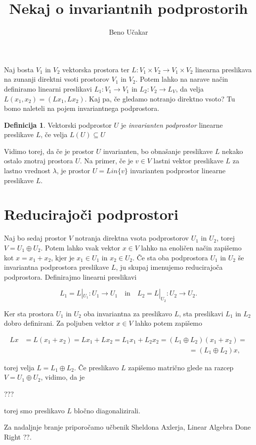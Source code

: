 \documentclass[a4paper,12pt]{article}
\theoremstyle{definition}
\newtheorem{definicija}{Definicija}
\begin{document}
    \title{Nekaj o invariantnih podprostorih}
    \author{Beno Učakar}
    \date{}
\maketitle

Naj bosta $V_1$ in $V_2$ vektorska prostora ter $L \colon V_1 \times V_2 \to V_1 \times V_2$ linearna preslikava na zunanji direktni vsoti prostorov $V_1$ in $V_2$.
Potem lahko na narave način definiramo linearni preslikavi $L_1 \colon V_1 \to V_1$ in $L_2 \colon V_2 \to L_V$, da velja  
\(L(x_1, x_2) = (Lx_1, Lx_2).\)
Kaj pa, če gledamo notranjo direktno vsoto? Tu bomo naleteli na pojem invariantnega podprostora.

    \begin{definicija}
      Vektorski podprostor $U$ je \emph{invarianten podprostor} linearne preslikave $L$, če velja 
   \( L(U) \subseteq U \)
    \end{definicija}
    

Vidimo torej, da če je prostor $U$ invarianten, bo obnašanje preslikave $L$ nekako ostalo znotraj prostora $U$.
Na primer, če je $v\in V$ lastni vektor preslikave $L$ za lastno vrednost \( \lambda\), je prostor 
\(U = Lin \{ v \}\) invarianten podprostor linearne preslikave $L$.


\section*{Reducirajoči podprostori} 
Naj bo sedaj prostor $V$ notranja direktna vsota podprostorov $U_1$ in $U_2$, torej $V = U_1 \oplus U_2$.
Potem lahko vsak vektor $x \in V$ lahko na enoličen način zapišemo kot $x = x_1 + x_2$, kjer je $x_1 \in U_1$ in $x_2 \in U_2$.
Če sta oba podprostora $U_1$ in $U_2$ še invariantna podprostora preslikave $L$, ju skupaj imenujemo reducirajoča podprostora.
Definirajmo linearni preslikavi 

\[L_1 = L| _{U_1} \colon U_1 \to U_1 \quad \text{in} \quad L_2 = L| _{U_2} \colon U_2 \to U_2.\] 


Ker sta prostora $U_1$ in $U_2$ oba invariantna za preslikavo $L$, sta preslikavi $L_1$ in $L_2$ dobro definirani.
Za poljuben vektor $x \in V$ lahko potem zapišemo 


\begin{equation}
    \begin{aligned}
        Lx &= L(x_1 + x_2) = Lx_1 + Lx_2 = L_1x_1 + L_2x_2 = (L_1 \oplus L_2)(x_1 + x_2)= \\
        &\hspace{10cm} =(L_1 \oplus L_2)x,
    \end{aligned}
    \end{equation}
    
% 
torej velja $L = L_1 \oplus L_2$.
Če preslikavo $L$ zapišemo matrično glede na razcep $V = U_1 \oplus U_2$, vidimo, da je

???

torej smo preslikavo $L$ bločno diagonalizirali.

Za nadaljnje branje priporočamo učbenik Sheldona Axlerja, Linear Algebra Done Right ??.
\end{document}

